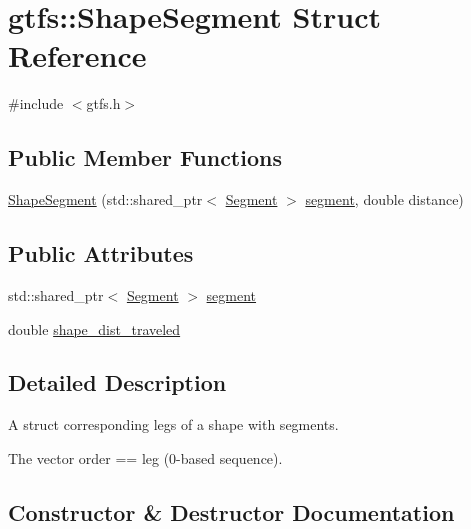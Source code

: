 \hypertarget{structgtfs_1_1ShapeSegment}{}\section{gtfs\+:\+:Shape\+Segment Struct Reference}
\label{structgtfs_1_1ShapeSegment}


{\ttfamily \#include $<$gtfs.\+h$>$}

\subsection*{Public Member Functions}
\begin{DoxyCompactItemize}
\item 
\hyperlink{structgtfs_1_1ShapeSegment_af1bdb1504d16a49ab6ac8ea34da59c5f}{Shape\+Segment} (std\+::shared\+\_\+ptr$<$ \hyperlink{classgtfs_1_1Segment}{Segment} $>$ \hyperlink{structgtfs_1_1ShapeSegment_a3253b76a15e2645f894a75be55006e09}{segment}, double distance)
\end{DoxyCompactItemize}
\subsection*{Public Attributes}
\begin{DoxyCompactItemize}
\item 
std\+::shared\+\_\+ptr$<$ \hyperlink{classgtfs_1_1Segment}{Segment} $>$ \hyperlink{structgtfs_1_1ShapeSegment_a3253b76a15e2645f894a75be55006e09}{segment}
\item 
double \hyperlink{structgtfs_1_1ShapeSegment_a64afdd03235b9bc256fc18652c6f9c47}{shape\+\_\+dist\+\_\+traveled}
\end{DoxyCompactItemize}


\subsection{Detailed Description}
A struct corresponding legs of a shape with segments.

The vector order == leg (0-\/based sequence). 

\subsection{Constructor \& Destructor Documentation}
\mbox{\label{structgtfs_1_1ShapeSegment_af1bdb1504d16a49ab6ac8ea34da59c5f}} 
